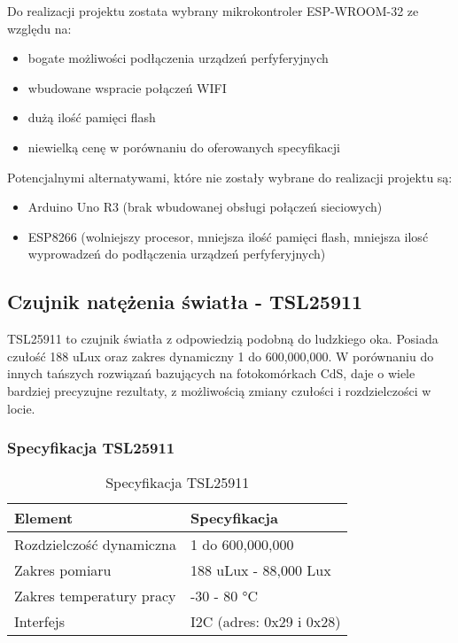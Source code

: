 \documentclass[12pt,a4paper]{article}
\begin{document}
Do realizacji projektu zostata wybrany mikrokontroler ESP-WROOM-32 ze względu na:

\begin{itemize}
    \item bogate możliwości podłączenia urządzeń perfyferyjnych
    \item wbudowane wspracie połączeń WIFI
    \item dużą ilość pamięci flash
    \item niewielką cenę w porównaniu do oferowanych specyfikacji
\end{itemize}

\bigskip
Potencjalnymi alternatywami, które nie zostały wybrane do realizacji projektu są:
\begin{itemize}
    \item Arduino Uno R3 (brak wbudowanej obsługi połączeń sieciowych)
    \item ESP8266 (wolniejszy procesor, mniejsza ilość pamięci flash, mniejsza ilosć wyprowadzeń do podłączenia urządzeń perfyferyjnych)
\end{itemize}

\subsection{Czujnik natężenia światła - TSL25911}

TSL25911 to czujnik światła z odpowiedzią podobną do ludzkiego oka. Posiada czułość 188 uLux oraz zakres dynamiczny 1 do 600,000,000.
W porównaniu do innych tańszych rozwiązań bazujących na fotokomórkach CdS, daje o wiele bardziej precyzujne rezultaty, z możliwością zmiany czułości i
rozdzielczości w locie. 

\subsubsection{Specyfikacja TSL25911}

\begin{table}[H]
    \centering
    \begin{tabular}{|l|l|}
        \hline
        Element & Specyfikacja \\
        \hline
        Rozdzielczość dynamiczna & 1 do 600,000,000 \\
        \hline
        Zakres pomiaru & 188 uLux - 88,000 Lux \\
        \hline
        Zakres temperatury pracy & -30 - 80 °C \\
        \hline
        Interfejs & I2C (adres: 0x29 i 0x28)\\
        \hline
    \end{tabular}
    \caption{Specyfikacja TSL25911}
    \label{tsl25911-spec}
\end{table}
\end{document}
